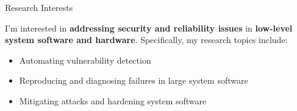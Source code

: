 \begin{rSection}{Research Interests}
\newcommand{\eg}{\textit{e}.\textit{g}.\xspace}

I'm interested in \textbf{addressing security and reliability issues}
in \textbf{low-level system software and hardware}. Specifically, my
research topics include:

\begin{itemize}[leftmargin=*,itemsep=-5pt]
\item{Automating vulnerability detection}
\item{Reproducing and diagnosing failures in large system software}
\item{Mitigating attacks and hardening system software}
\end{itemize}


\end{rSection}
